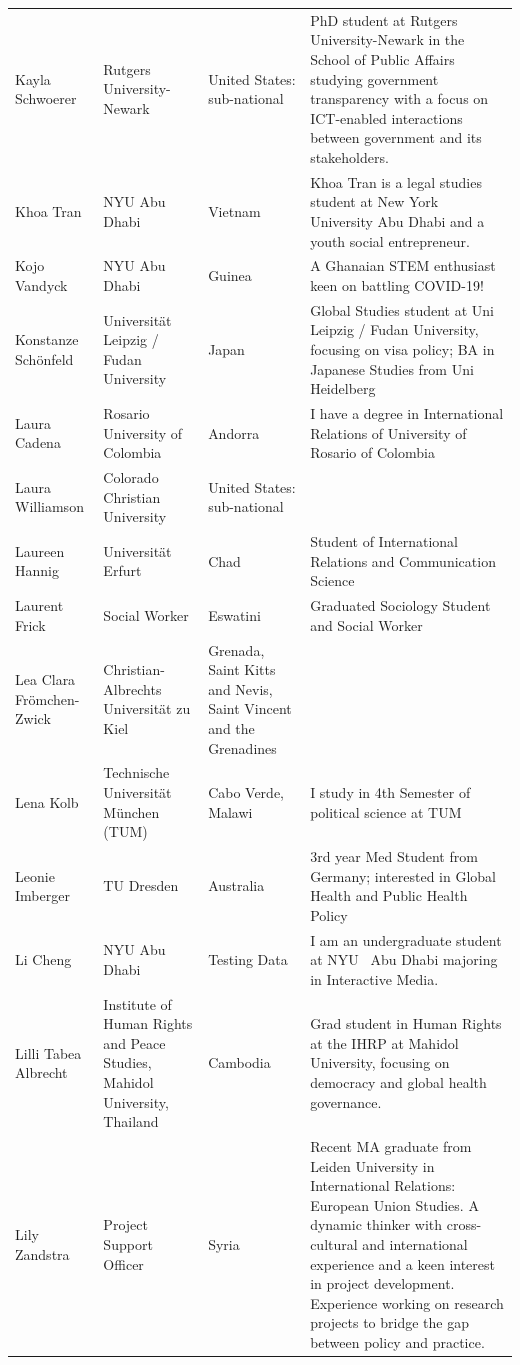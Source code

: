 \documentclass[]{article}
\begin{document}
\begin{longtable}{l>{\raggedright\arraybackslash}p{2cm}>{\raggedright\arraybackslash}p{2cm}>{\raggedright\arraybackslash}p{3cm}}
Kayla Schwoerer & Rutgers University-Newark & United States: sub-national & PhD student at Rutgers University-Newark in the School of Public Affairs studying government transparency with a focus on ICT-enabled interactions between government and its stakeholders.\\
\addlinespace
\rowcolor{gray!6}  Khoa Tran & NYU Abu Dhabi & Vietnam & Khoa Tran is a legal studies student at New York University Abu Dhabi and a youth social entrepreneur.\\
Kojo Vandyck & NYU Abu Dhabi & Guinea & A Ghanaian STEM enthusiast keen on battling COVID-19!\\
\rowcolor{gray!6}  Konstanze Schönfeld & Universität Leipzig / Fudan University & Japan & Global Studies student at Uni Leipzig / Fudan University, focusing on visa policy; BA in Japanese Studies from Uni Heidelberg\\
Laura Cadena & Rosario University of Colombia & Andorra & I have a degree in International Relations of University of Rosario of Colombia\\
\rowcolor{gray!6}  Laura Williamson & Colorado Christian University & United States: sub-national & \\
\addlinespace
Laureen Hannig & Universität Erfurt & Chad & Student of International Relations and Communication Science\\
\rowcolor{gray!6}  Laurent Frick & Social Worker & Eswatini & Graduated Sociology Student and Social Worker\\
Lea Clara Frömchen-Zwick & Christian-Albrechts Universität zu Kiel & Grenada, Saint Kitts and Nevis, Saint Vincent and the Grenadines & \\
\rowcolor{gray!6}  Lena Kolb & Technische Universität München (TUM) & Cabo Verde, Malawi & I study in 4th Semester of political science at TUM\\
Leonie Imberger & TU Dresden & Australia & 3rd year Med Student from Germany; interested in Global Health and Public Health Policy\\
\addlinespace
\rowcolor{gray!6}  Li Cheng & NYU Abu Dhabi & Testing Data & I am an undergraduate student at NYU  Abu Dhabi majoring in Interactive Media.\\
Lilli Tabea Albrecht & Institute of Human Rights and Peace Studies, Mahidol University, Thailand & Cambodia & Grad student in Human Rights at the IHRP at Mahidol University, focusing on democracy and global health governance.\\
\rowcolor{gray!6}  Lily Zandstra & Project Support Officer & Syria & Recent MA graduate from Leiden University in International Relations: European Union Studies. A dynamic thinker with cross-cultural and international experience and a keen interest in project development. Experience working on research projects to bridge the gap between policy and practice.\\

\end{longtable}
\end{document}

